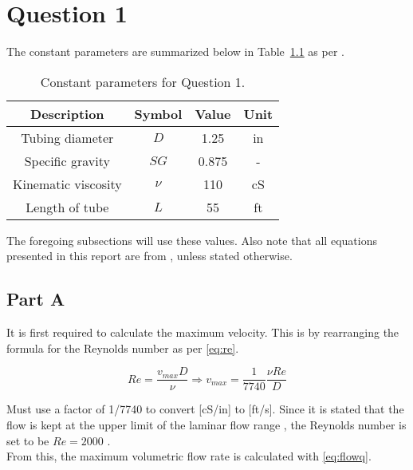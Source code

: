 \chapter{Question 1}
\label{chap:q1}

The constant parameters are summarized below in Table~\ref{tab:q1param} as per \cite{assign}.

\begin{table}[H]
  \centering
  \caption{Constant parameters for Question 1.}
    \begin{tabular}{cccc}
	\toprule    
    \textbf{Description} & \textbf{Symbol} & \textbf{Value } & \textbf{Unit} \\
    \midrule
    Tubing diameter 		& $D$     & 1.25  & in \\
    Specific gravity 		& $SG$    & 0.875  & - \\
    Kinematic viscosity 	& $\nu$    & 110   & cS \\
    Length of tube 			& $L$     & 55    & ft \\
    \bottomrule
    \end{tabular}
  \label{tab:q1param}
\end{table}

The foregoing subsections will use these values. Also note that all equations presented in this report are from \cite{formula}, unless stated otherwise.

\section{Part A}
\label{sect:1a}

It is first required to calculate the maximum velocity. This is by rearranging the formula for the Reynolds number as per \ref{eq:re}.

\begin{equation}
	\label{eq:re}
	Re = \frac{v_{max}D}{\nu} \Rightarrow v_{max} = \frac{1}{7740} \frac{\nu Re}{D}
\end{equation}

Must use a factor of 1/7740 to convert [cS/in] to [ft/s]. Since it is stated that the flow is kept at the upper limit of the laminar flow range \cite{assign}, the Reynolds number is set to be $Re=2000$ \cite{fluids}.\\

From this, the maximum volumetric flow rate is calculated with \ref{eq:flowq}.

